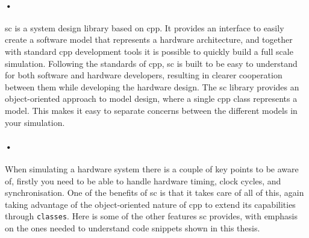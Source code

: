 \documentclass[a4paper, 12pt]{report}
\newcommand{\codeword}[1]{\texttt{#1}}
\begin{document}
\paragraph{•}
\gls{sc} is a system design library based on \gls{cpp}.
It provides an interface to easily create a software model that represents a hardware architecture, and together with standard \gls{cpp} development tools it is possible to quickly build a full scale simulation.
Following the standards of \gls{cpp}, \gls{sc} is built to be easy to understand for both software and hardware developers, resulting in clearer cooperation between them while developing the hardware design.
The \gls{sc} library provides an object-oriented approach to model design, where a single \gls{cpp} class represents a model.
This makes it easy to separate concerns between the different models in your simulation.
\paragraph{•}
When simulating a hardware system there is a couple of key points to be aware of, firstly you need to be able to handle hardware timing, clock cycles, and synchronisation.
One of the benefits of \gls{sc} is that it takes care of all of this, again taking advantage of the object-oriented nature of \gls{cpp} to extend its capabilities through \codeword{classes}.
Here is some of the other features \gls{sc} provides, with emphasis on the ones needed to understand code snippets shown in this thesis.
\end{document}

